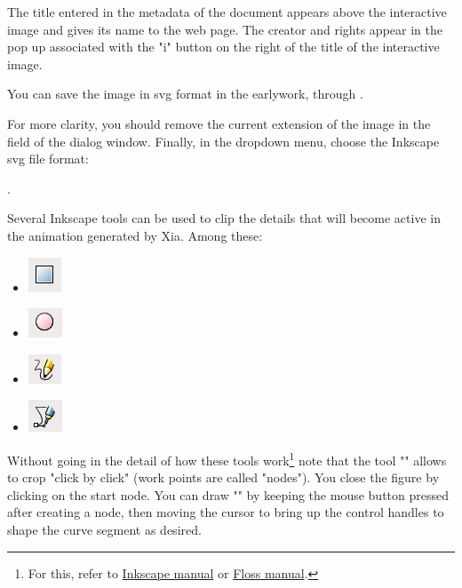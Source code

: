  The title entered in the metadata of the document appears above 
the interactive image and gives its name to the web page. The creator and 
 rights appear in the pop up associated with the "i" button 
on the right of the title of the interactive image.

You can save the image in svg format in the earlywork, 
through  .

For more clarity, you should remove the current extension of the image 
in the field  of the dialog window. Finally, in the 
dropdown menu, choose the Inkscape svg file format:

.

Several Inkscape tools can be used to clip the details that
will become active in the animation generated by Xia. Among these:
\begin{itemize}
 \item \includegraphics[scale=0.5]{./images/square} 
 \item \includegraphics[scale=0.5]{./images/circles} 
 \item \includegraphics[scale=0.5]{./images/line} 
 \item \includegraphics[scale=0.5]{./images/bezier} 
\end{itemize}

Without going in the detail of how these tools work\footnote{For this, 
refer to \href{http://inkscape.org/doc/shapes/tutorial-shapes.fr.html}{Inkscape manual} or \href{http://en.flossmanuals.net/inkscape/}{Floss manual}.} note that the tool "" 
allows to crop "click by click" (work points are called 
"nodes").  You close the figure by clicking on the start node. 
You can draw "" by keeping the mouse button pressed 
after creating a node, then moving the cursor to bring up the control handles 
to shape the curve segment as desired.


